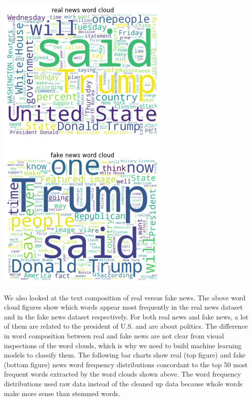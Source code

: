 \documentclass{article}
\begin{document}
\begin{multicols}{2}
\begin{center}
\includegraphics[scale=0.45]{images/wd2.png}
\end{center}

We also looked at the text composition of real versus fake news. The above word cloud figures show which words appear most frequently in the real news dataset and in the fake news dataset respectively. For both real news and fake news, a lot of them are related to the president of U.S. and are about politics. The difference in word composition between real and fake news are not clear from visual inspections of the word clouds, which is why we need to build machine learning models to classify them. The following bar charts show real (top figure) and fake (bottom figure) news word frequency distributions concordant to the top 50 most frequent words extracted by the word clouds shown above. The word frequency distributions used raw data instead of the cleaned up data because whole words make more sense than stemmed words.


\end{multicols}
\end{document}

